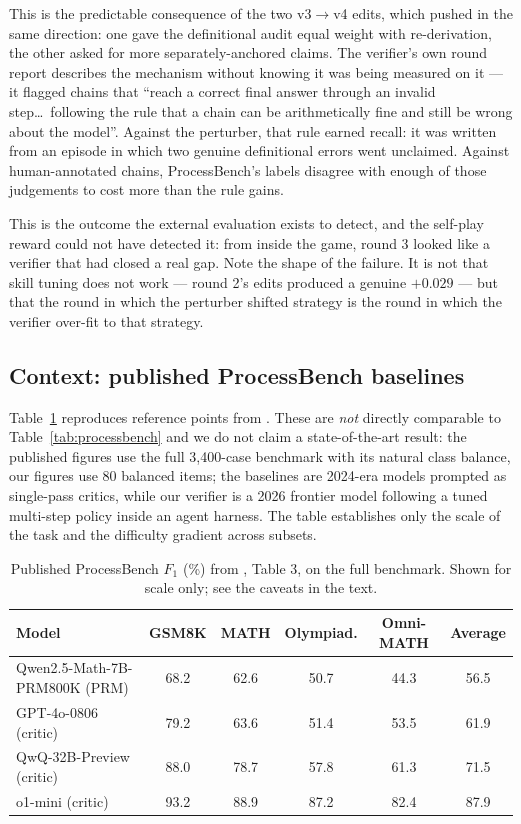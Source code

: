 \documentclass{article} %
\begin{document}
This is the predictable consequence of the two v3$\rightarrow$v4 edits, which pushed in the
same direction: one gave the definitional audit equal weight with re-derivation, the other
asked for more separately-anchored claims. The verifier's own round report describes the
mechanism without knowing it was being measured on it --- it flagged chains that ``reach a
correct final answer through an invalid step\ldots\ following the rule that a chain can be
arithmetically fine and still be wrong about the model''. Against the perturber, that rule
earned recall: it was written from an episode in which two genuine definitional errors went
unclaimed. Against human-annotated chains, ProcessBench's labels disagree with enough of
those judgements to cost more than the rule gains.

This is the outcome the external evaluation exists to detect, and the self-play reward could
not have detected it: from inside the game, round 3 looked like a verifier that had closed a
real gap. Note the shape of the failure. It is not that skill tuning does not work --- round
2's edits produced a genuine $+0.029$ --- but that the round in which the perturber shifted
strategy is the round in which the verifier over-fit to that strategy.

\subsection{Context: published ProcessBench baselines}

Table~\ref{tab:baselines} reproduces reference points from \citet{zheng2024processbench}.
These are \emph{not} directly comparable to Table~\ref{tab:processbench} and we do not claim
a state-of-the-art result: the published figures use the full 3,400-case benchmark with its
natural class balance, our figures use 80 balanced items; the baselines are 2024-era models
prompted as single-pass critics, while our verifier is a 2026 frontier model following a
tuned multi-step policy inside an agent harness. The table establishes only the scale of the
task and the difficulty gradient across subsets.

\begin{table}[t]
\caption{Published ProcessBench $F_1$ (\%) from \citet{zheng2024processbench}, Table 3, on
the full benchmark. Shown for scale only; see the caveats in the text.}
\label{tab:baselines}
\begin{center}
\small
\begin{tabular}{lccccc}
\toprule
Model & GSM8K & MATH & Olympiad. & Omni-MATH & Average \\
\midrule
Qwen2.5-Math-7B-PRM800K (PRM) & 68.2 & 62.6 & 50.7 & 44.3 & 56.5 \\
GPT-4o-0806 (critic) & 79.2 & 63.6 & 51.4 & 53.5 & 61.9 \\
QwQ-32B-Preview (critic) & 88.0 & 78.7 & 57.8 & 61.3 & 71.5 \\
o1-mini (critic) & 93.2 & 88.9 & 87.2 & 82.4 & 87.9 \\
\bottomrule
\end{tabular}
\end{center}
\end{table}
\end{document}
